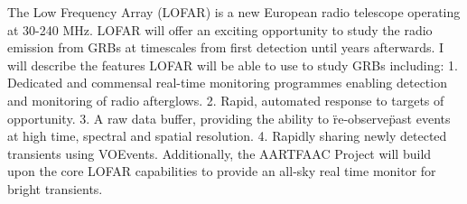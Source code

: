 


\bigskip



\bigskip

\noindent The Low Frequency Array (LOFAR) is a new European radio telescope operating at 30-240 MHz. LOFAR will offer an exciting opportunity to study the radio emission from GRBs at timescales from first detection until years afterwards. I will describe the features LOFAR will be able to use to study GRBs including:
1. Dedicated and commensal real-time monitoring programmes enabling detection and monitoring of radio afterglows.
2. Rapid, automated response to targets of opportunity.
3. A raw data buffer, providing the ability to \"re-observe\" past events at high time, spectral and spatial resolution.
4. Rapidly sharing newly detected transients using VOEvents.
Additionally, the AARTFAAC Project will build upon the core LOFAR capabilities to provide an all-sky real time monitor for bright transients.

